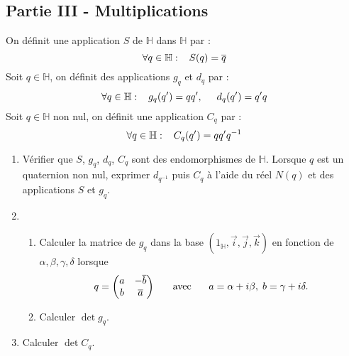 \subsection*{Partie III - Multiplications}
On définit une application $S$ de $\mathbb{H}$ dans $\mathbb{H}$ par :
\[\forall q \in \mathbb{H} :\hspace{0.3cm} S(q)=\overline{q}\]
Soit $q\in \mathbb{H}$, on définit des applications $g_q$ et $d_q$ par :
\[\forall q \in \mathbb{H} : \hspace{0.3cm} g_q(q')=qq' , \hspace{0.5cm} d_q(q')=q'q\]
Soit $q\in \mathbb{H}$ non nul, on définit une application $C_q$ par :
\[\forall q \in \mathbb{H} :\hspace{0.3cm} C_q(q')=qq'q^{-1}\]
\begin{enumerate}
\item Vérifier que $S$, $g_q$, $d_q$, $C_q$ sont des endomorphismes de $\mathbb{H}$. Lorsque $q$ est un quaternion non nul, exprimer $d_{q^{-1}}$ puis $C_q$ à l'aide du réel $N(q)$ et des applications $S$ et $g_q$.
\item \begin{enumerate}
\item Calculer la matrice de $g_q$ dans la base $(1_{\mathbb{H}},\overrightarrow{i},\overrightarrow{j},\overrightarrow{k})$ en fonction de $\alpha , \beta , \gamma , \delta$ lorsque
\begin{displaymath}
q=\begin{pmatrix}
 a & -\overline{b}  \\ 
 b & \overline{a}
\end{pmatrix}
\hspace{0.5cm}\text{ avec } \hspace{0.5cm} a=\alpha +i \beta,\; b=\gamma + i\delta.
\end{displaymath}

\item Calculer $\det g_q$.
\end{enumerate} 
\item Calculer $\det C_q$.
\end{enumerate} 

